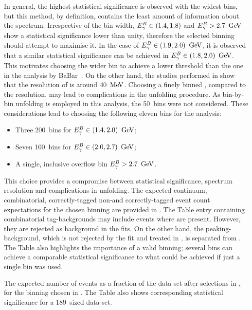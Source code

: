 In general, the highest statistical significance is observed with the widest bins, but this method, by definition, contains the least amount of information about the spectrum.
Irrespective of the bin width,  ${E^B_{\gamma}}\in(1.4,1.8)$ and ${E^B_{\gamma}}>2.7~\mathrm{\,Ge\kern -0.1em V}$ show a statistical significance lower than unity, therefore the selected binning should attempt to maximise it.
In the case of ${E^B_{\gamma}}\in(1.9,2.0)~\mathrm{\,Ge\kern -0.1em V}$, it is observed that a similar statistical significance can be achieved in ${E^B_{\gamma}}\in(1.8,2.0)~\mathrm{\,Ge\kern -0.1em V}$.
This motivates choosing the wider bin to achieve a lower threshold than the one in the analysis by BaBar~\cite{BaBar:2007yhb}.
On the other hand, the studies performed in  show that the resolution of \EB is around $40~\mathrm{\,Me\kern -0.1em V}$.
Choosing a finely binned \EB, compared to the resolution, may lead to complications in the unfolding procedure.
As bin-by-bin unfolding is employed in this analysis, the 50~\mev bins were not considered.
These considerations lead to choosing the following eleven \EB bins for the analysis:
\begin{itemize}
    \item Three 200~\mev bins for ${E^B_{\gamma}}\in(1.4,2.0)~\mathrm{\,Ge\kern -0.1em V}$;
    \item Seven 100~\mev bins for ${E^B_{\gamma}}\in(2.0,2.7)~\mathrm{\,Ge\kern -0.1em V}$;
    \item A single, inclusive overflow bin ${E^B_{\gamma}}>2.7~\mathrm{\,Ge\kern -0.1em V}$.
\end{itemize}
This choice provides a compromise between statistical significance, \EB spectrum resolution and complications in unfolding.
The expected continuum, combinatorial, correctly-tagged non-\BtoXsgamma and correctly-tagged \BtoXsgamma event count expectations for the chosen binning are provided in .
The Table entry containing combinatorial tag-\B backgrounds may include events where \BtoXsgamma are present.
However, they are rejected as background in the \Mbc fits.
On the other hand, the peaking-\BB background, which is not rejected by the \Mbc fit and treated in , is separated from \BtoXsgamma.
The Table also highlights the importance of a valid binning; several bins can achieve a comparable statistical significance to what could be achieved if just a single bin was used.

\begin{table}[hbtp!]
    \caption{\label{tab:expected_events}
    The expected number of events as a fraction of the data set after selections in , for the binning chosen in .
    The Table also shows corresponding statistical significance for a 189~\invfb sized data set.
    }
    
\end{table}


